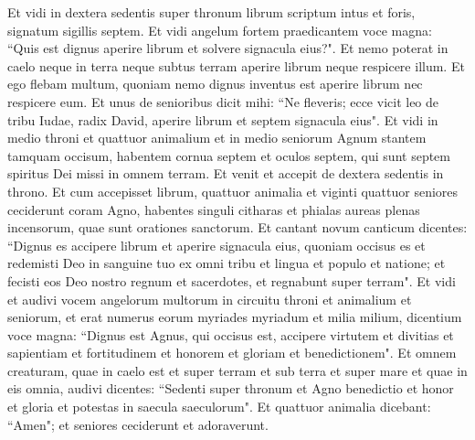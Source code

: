 \begin{biblechapter}  
\verse Et vidi in dextera sedentis super thronum librum scriptum intus et foris, signatum sigillis septem. 
\verse Et vidi angelum fortem praedicantem voce magna: “Quis est dignus aperire librum et solvere signacula eius?". 
\verse Et nemo poterat in caelo neque in terra neque subtus terram aperire librum neque respicere illum. 
\verse Et ego flebam multum, quoniam nemo dignus inventus est aperire librum nec respicere eum. 
\verse Et unus de senioribus dicit mihi: “Ne fleveris; ecce vicit leo de tribu Iudae, radix David, aperire librum et septem signacula eius". 
\verse Et vidi in medio throni et quattuor animalium et in medio seniorum Agnum stantem tamquam occisum, habentem cornua septem et oculos septem, qui sunt septem spiritus Dei missi in omnem terram. 
\verse Et venit et accepit de dextera sedentis in throno. 
\verse Et cum accepisset librum, quattuor animalia et viginti quattuor seniores ceciderunt coram Agno, habentes singuli citharas et phialas aureas plenas incensorum, quae sunt orationes sanctorum. 
\verse Et cantant novum canticum dicentes: “Dignus es accipere librum et aperire signacula eius, quoniam occisus es et redemisti Deo in sanguine tuo ex omni tribu et lingua et populo et natione; 
\verse et fecisti eos Deo nostro regnum et sacerdotes, et regnabunt super terram". 
\verse Et vidi et audivi vocem angelorum multorum in circuitu throni et animalium et seniorum, et erat numerus eorum myriades myriadum et milia milium, 
\verse dicentium voce magna: “Dignus est Agnus, qui occisus est, accipere virtutem et divitias et sapientiam et fortitudinem et honorem et gloriam et benedictionem". 
\verse Et omnem creaturam, quae in caelo est et super terram et sub terra et super mare et quae in eis omnia, audivi dicentes: “Sedenti super thronum et Agno benedictio et honor et gloria et potestas in saecula saeculorum". 
\verse Et quattuor animalia dicebant: “Amen"; et seniores ceciderunt et adoraverunt. 
\end{biblechapter}

